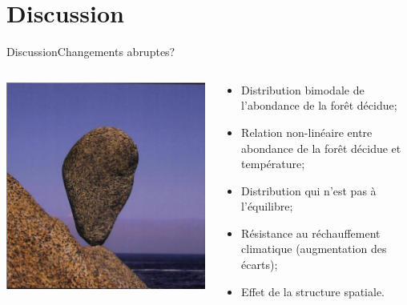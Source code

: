 \documentclass{eecslides}
\begin{document}
\section{Discussion}

	\begin{frame}{Discussion}{Changements abruptes?}
		\begin{columns}
			\begin{column}{0.5\textwidth}
				\begin{center}
				\includegraphics[height=0.6\textheight]{scheffer}\\
				\end{center}
			\end{column}
			\begin{column}{0.5\textwidth}
				\begin{itemize}
				\item Distribution bimodale de l'abondance de la forêt décidue;
				\item Relation non-linéaire entre abondance de la forêt décidue et température;
				\item Distribution qui n'est pas à l'équilibre;
				\item Résistance au réchauffement climatique (augmentation des écarts);
				\item Effet de la structure spatiale.
				\end{itemize}
			\end{column}
		\end{columns}	
	\end{frame}
\end{document}
